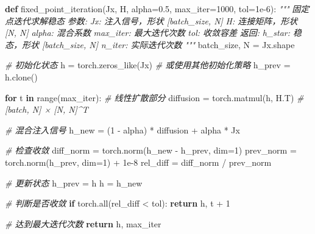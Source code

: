 \documentclass[
  12pt,
]{article}
\newenvironment{Shaded}{}{}
\newcommand{\BuiltInTok}[1]{#1}
\newcommand{\CommentTok}[1]{\textcolor[rgb]{0.38,0.63,0.69}{\textit{#1}}}
\newcommand{\ControlFlowTok}[1]{\textcolor[rgb]{0.00,0.44,0.13}{\textbf{#1}}}
\newcommand{\DecValTok}[1]{\textcolor[rgb]{0.25,0.63,0.44}{#1}}
\newcommand{\FloatTok}[1]{\textcolor[rgb]{0.25,0.63,0.44}{#1}}
\newcommand{\KeywordTok}[1]{\textcolor[rgb]{0.00,0.44,0.13}{\textbf{#1}}}
\newcommand{\NormalTok}[1]{#1}
\newcommand{\OperatorTok}[1]{\textcolor[rgb]{0.40,0.40,0.40}{#1}}
\begin{document}
\begin{Shaded}
\begin{Highlighting}[]
\KeywordTok{def}\NormalTok{ fixed\_point\_iteration(Jx, H, alpha}\OperatorTok{=}\FloatTok{0.5}\NormalTok{, max\_iter}\OperatorTok{=}\DecValTok{1000}\NormalTok{, tol}\OperatorTok{=}\FloatTok{1e{-}6}\NormalTok{):}
    \CommentTok{"""}
\CommentTok{    固定点迭代求解稳态}
\CommentTok{    }
\CommentTok{    参数:}
\CommentTok{        Jx: 注入信号，形状 [batch\_size, N]}
\CommentTok{        H: 连接矩阵，形状 [N, N]}
\CommentTok{        alpha: 混合系数}
\CommentTok{        max\_iter: 最大迭代次数}
\CommentTok{        tol: 收敛容差}
\CommentTok{    }
\CommentTok{    返回:}
\CommentTok{        h\_star: 稳态，形状 [batch\_size, N]}
\CommentTok{        n\_iter: 实际迭代次数}
\CommentTok{    """}
\NormalTok{    batch\_size, N }\OperatorTok{=}\NormalTok{ Jx.shape}
    
    \CommentTok{\# 初始化状态}
\NormalTok{    h }\OperatorTok{=}\NormalTok{ torch.zeros\_like(Jx)  }\CommentTok{\# 或使用其他初始化策略}
\NormalTok{    h\_prev }\OperatorTok{=}\NormalTok{ h.clone()}
    
    \ControlFlowTok{for}\NormalTok{ t }\KeywordTok{in} \BuiltInTok{range}\NormalTok{(max\_iter):}
        \CommentTok{\# 线性扩散部分}
\NormalTok{        diffusion }\OperatorTok{=}\NormalTok{ torch.matmul(h, H.T)  }\CommentTok{\# [batch, N] × [N, N]\^{}T}
        
        \CommentTok{\# 混合注入信号}
\NormalTok{        h\_new }\OperatorTok{=}\NormalTok{ (}\DecValTok{1} \OperatorTok{{-}}\NormalTok{ alpha) }\OperatorTok{*}\NormalTok{ diffusion }\OperatorTok{+}\NormalTok{ alpha }\OperatorTok{*}\NormalTok{ Jx}
        
        \CommentTok{\# 检查收敛}
\NormalTok{        diff\_norm }\OperatorTok{=}\NormalTok{ torch.norm(h\_new }\OperatorTok{{-}}\NormalTok{ h\_prev, dim}\OperatorTok{=}\DecValTok{1}\NormalTok{)}
\NormalTok{        prev\_norm }\OperatorTok{=}\NormalTok{ torch.norm(h\_prev, dim}\OperatorTok{=}\DecValTok{1}\NormalTok{) }\OperatorTok{+} \FloatTok{1e{-}8}
\NormalTok{        rel\_diff }\OperatorTok{=}\NormalTok{ diff\_norm }\OperatorTok{/}\NormalTok{ prev\_norm}
        
        \CommentTok{\# 更新状态}
\NormalTok{        h\_prev }\OperatorTok{=}\NormalTok{ h}
\NormalTok{        h }\OperatorTok{=}\NormalTok{ h\_new}
        
        \CommentTok{\# 判断是否收敛}
        \ControlFlowTok{if}\NormalTok{ torch.}\BuiltInTok{all}\NormalTok{(rel\_diff }\OperatorTok{\textless{}}\NormalTok{ tol):}
            \ControlFlowTok{return}\NormalTok{ h, t }\OperatorTok{+} \DecValTok{1}
    
    \CommentTok{\# 达到最大迭代次数}
    \ControlFlowTok{return}\NormalTok{ h, max\_iter}
\end{Highlighting}
\end{Shaded}
\end{document}
